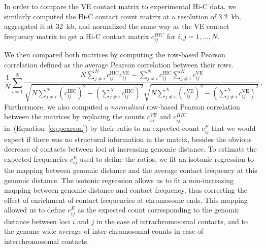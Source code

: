 In order to compare the VE contact matrix to experimental Hi-C data,
we similarly computed the Hi-C contact count matrix at a resolution of
3.2~kb, aggregated it at 32~kb, and normalized the same way as the VE
contact frequency matrix to get a Hi-C contact matrix
$c_{ij}^{HIC}$ for $i,j=1,\ldots,N$.

We then compared both matrices by computing the row-based Pearson correlation
\citep{tjong:physical} defined as the average Pearson correlation between their rows.
\begin{equation}\label{eq:pearson}
\frac{1}{N} \sum_{i=1}^{N} \frac{
  N \sum_{j \neq i}^N c_{ij}^{\text{HIC}}{c}_{ij}^{\text{VE}} -
  \sum_{j \neq i}^N {c}_{ij}^{\text{HIC}} \sum_{j \neq i}^N {c}_{ij}^{\text{VE}}
}{
\sqrt{N \sum_{j \neq i }^N({c}_{ij}^{\text{HIC}})^2 - (\sum_{j \neq i}^N
{c}_{ij}^{\text{HIC}})^2}
\sqrt{N \sum_{j \neq i }^N({c}_{ij}^{\text{VE}})^2 - (\sum_{j \neq i}^N
{c}_{ij}^{\text{VE}})^2}}\,.
\end{equation}
Furthermore, we also computed a \emph{normalized} row-based Pearson correlation
between the matrices by replacing the counts $c^{VE}_{ij}$ and $c^{HIC}_{ij}$
in~(Equation~\ref{eq:pearson}) by their ratio to an expected count $c^E_{ij}$ that we
would expect if there was no structural information in the matrix, besides
the obvious decrease of contacts between loci at increasing genomic
distance. To estimate the
expected frequencies $c^E_{ij}$ used to define the ratios, we fit an
isotonic regression to the mapping between genomic distance and the average
contact frequency at this genomic distance. The isotonic regression
allows us
to fit a non-increasing mapping between genomic distance and contact
frequency, thus correcting the effect of enrichment of contact frequencies
at chromosome ends. This mapping allowed us to define $e_{ij}^E$ as the expected
count corresponding to the genomic distance between loci $i$ and $j$ in the
case of intrachromosomal contacts, and to the genome-wide average of
inter chromosomal counts in case of interchromosomal contacts.




